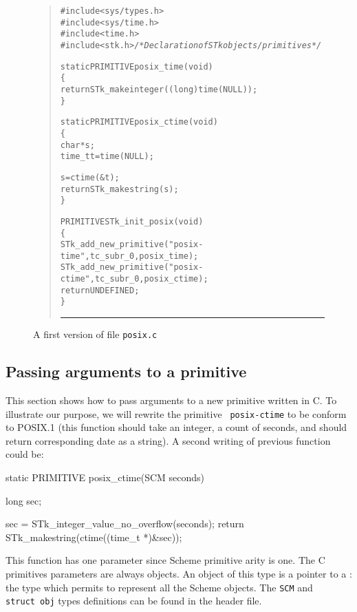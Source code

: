 \documentclass[10pt]{article}
\begin{document}
\begin{figure}
\begin{quote} \footnotesize
\begin{alltt}
#include <sys/types.h>
#include <sys/time.h>
#include <time.h>
#include <stk.h>        {\em /* Declaration of STk objects/primitives */}

static PRIMITIVE posix_time(void)
\{
  return STk_makeinteger((long) time(NULL));
\}

static PRIMITIVE posix_ctime(void)
\{
  char *s;
  time_t t = time(NULL);

  s = ctime(&t);
  return STk_makestring(s);
\}

PRIMITIVE STk_init_posix(void)
\{
  STk_add_new_primitive("posix-time",  tc_subr_0, posix_time);
  STk_add_new_primitive("posix-ctime", tc_subr_0, posix_ctime);
  return UNDEFINED;
\}
\end{alltt}
{\caption{A first version of file {\tt posix.c}}}
\label{posix-1}
\vskip2mm\hrule\vskip3mm
\end{quote}
\end{figure} 

\subsection{Passing arguments to a primitive}

This section shows how to pass arguments to a new primitive written in
C. To illustrate our purpose, we will rewrite the primitive {\tt
posix-ctime} to be conform to POSIX.1 (this function should take an
integer, a count of seconds, and should return corresponding date as a
string). A second writing of previous function could be:

\begin{Code}
\begin{listing}[200]{2}
static PRIMITIVE posix_ctime(SCM seconds)
{
  long sec;

  sec = STk_integer_value_no_overflow(seconds);
  return STk_makestring(ctime((time_t *)&sec));
}
\end{listing}
\end{Code}


This function has one parameter since Scheme primitive arity is one. The
C primitives parameters are always  objects. An object of this type is
a pointer to a : the type which permits to represent all the
Scheme objects.  The {\tt SCM} and {\tt struct~obj} types definitions can
be found in the  header file. 
\end{document}
